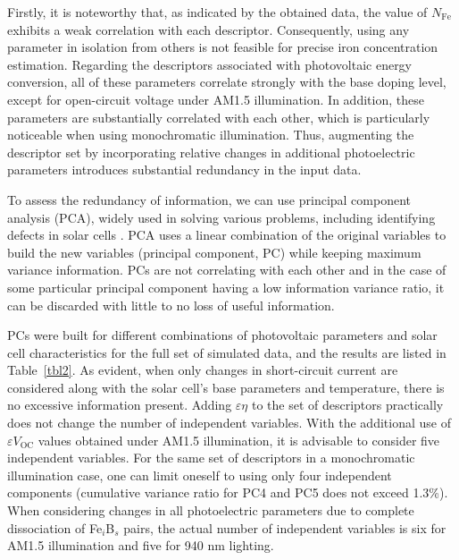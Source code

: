 \documentclass[a4paper,fleqn]{cas-sc}
\begin{document}
Firstly, it is noteworthy that, as indicated by the obtained data,
the value of $N_\mathrm{Fe}$ exhibits a weak correlation with each descriptor.
Consequently, using any parameter in isolation from others is not feasible for precise iron concentration estimation.
Regarding the descriptors associated with photovoltaic energy conversion,
all of these parameters correlate strongly with the base doping level, except for open-circuit voltage under AM1.5 illumination.
In addition, these parameters are substantially correlated with each
other, which is particularly noticeable when using monochromatic illumination.
Thus,  augmenting the descriptor set by incorporating relative changes in additional
photoelectric parameters introduces substantial redundancy in the input data.


To assess the redundancy of information, we can use principal component analysis (PCA),
widely used in solving various problems, including identifying defects in solar cells \cite{Fadhel2019}.
PCA uses a linear combination of the original variables to build the new variables (principal component, PC) while keeping maximum variance information.
PCs are not correlating with each other and
in the case of some particular principal component having a low information variance ratio, it can be discarded with little to no loss of useful information.

PCs were built for different combinations of photovoltaic parameters and solar cell characteristics
for the full set of simulated data, and the results are listed in Table~\ref{tbl2}.
As evident, when only changes in short-circuit current are considered along with the solar cell's base parameters and temperature,
there is no excessive information present.
Adding $\varepsilon \eta$ to the set of descriptors practically does not change the number of independent variables.
With the additional use of $\varepsilon V_\mathrm{OC}$ values obtained under AM1.5 illumination, it is advisable to consider five independent variables.
For the same set of descriptors in a monochromatic illumination case, one can limit oneself to using only four independent components
(cumulative variance ratio for PC4 and PC5 does not exceed 1.3\%).
When considering changes in all photoelectric parameters due to complete dissociation of Fe$_i$B$_s$ pairs,
the actual number of independent variables is six for AM1.5 illumination and five for 940 nm lighting.




\end{document}
